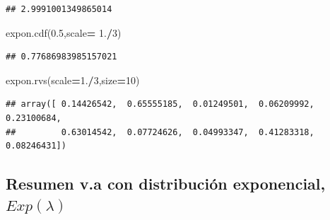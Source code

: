 \documentclass[]{book}
\newenvironment{Shaded}{\begin{snugshade}}{\end{snugshade}}
\newcommand{\DecValTok}[1]{\textcolor[rgb]{0.00,0.00,0.81}{#1}}
\newcommand{\FloatTok}[1]{\textcolor[rgb]{0.00,0.00,0.81}{#1}}
\newcommand{\NormalTok}[1]{#1}
\newcommand{\OperatorTok}[1]{\textcolor[rgb]{0.81,0.36,0.00}{\textbf{#1}}}
\begin{document}
\begin{verbatim}
## 2.9991001349865014
\end{verbatim}

\begin{Shaded}
\begin{Highlighting}[]
\NormalTok{expon.cdf(}\FloatTok{0.5}\NormalTok{,scale}\OperatorTok{=} \FloatTok{1.}\OperatorTok{/}\DecValTok{3}\NormalTok{) }
\end{Highlighting}
\end{Shaded}

\begin{verbatim}
## 0.77686983985157021
\end{verbatim}

\begin{Shaded}
\begin{Highlighting}[]
\NormalTok{expon.rvs(scale}\OperatorTok{=}\FloatTok{1.}\OperatorTok{/}\DecValTok{3}\NormalTok{,size}\OperatorTok{=}\DecValTok{10}\NormalTok{)}
\end{Highlighting}
\end{Shaded}

\begin{verbatim}
## array([ 0.14426542,  0.65555185,  0.01249501,  0.06209992,  0.23100684,
##         0.63014542,  0.07724626,  0.04993347,  0.41283318,  0.08246431])
\end{verbatim}

\hypertarget{resumen-v.a-con-distribuciuxf3n-exponencial-explambda}{%
\subsection{\texorpdfstring{Resumen v.a con distribución exponencial, \(Exp(\lambda)\)}{Resumen v.a con distribución exponencial, Exp(\textbackslash{}lambda)}}\label{resumen-v.a-con-distribuciuxf3n-exponencial-explambda}}
\end{document}
